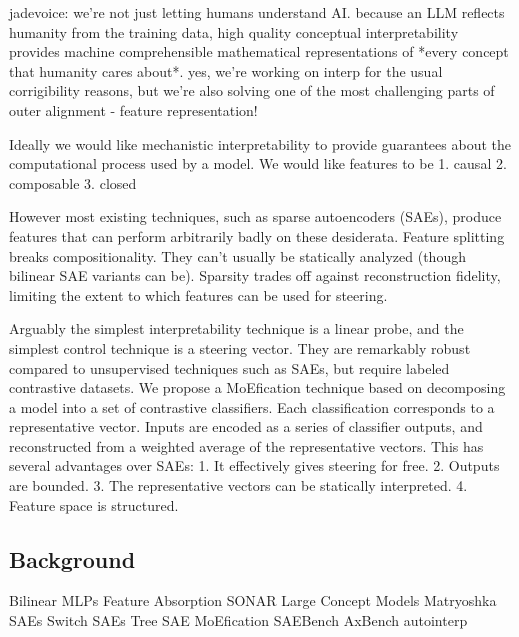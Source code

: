 jadevoice:
we're not just letting humans understand AI. because an LLM reflects humanity from the training data, high quality conceptual interpretability provides machine comprehensible mathematical representations of *every concept that humanity cares about*. yes, we're working on interp for the usual corrigibility reasons, but we're also solving one of the most challenging parts of outer alignment - feature representation!

Ideally we would like mechanistic interpretability to provide guarantees about
the computational process used by a model. We would like features to be
1. causal
2. composable
3. closed

However most existing techniques, such as sparse autoencoders (SAEs),
produce features that can perform arbitrarily badly on these desiderata.
Feature splitting breaks compositionality. 
They can't usually be statically analyzed (though bilinear SAE variants can be).
Sparsity trades off against reconstruction fidelity, limiting the extent to which 
features can be used for steering.

Arguably the simplest interpretability technique is a linear probe,
and the simplest control technique is a steering vector.
They are remarkably robust compared to unsupervised techniques such as SAEs,
but require labeled contrastive datasets.
We propose a MoEfication technique based on decomposing a model into a set of 
contrastive classifiers. Each classification corresponds to a representative vector.
Inputs are encoded as a series of classifier outputs, and reconstructed 
from a weighted average of the representative vectors.
This has several advantages over SAEs:
1. It effectively gives steering for free.
2. Outputs are bounded.
3. The representative vectors can be statically interpreted.
4. Feature space is structured.

\subsection{Background}
Bilinear MLPs
Feature Absorption
SONAR
Large Concept Models
Matryoshka SAEs
Switch SAEs
Tree SAE
MoEfication
SAEBench
AxBench
autointerp

